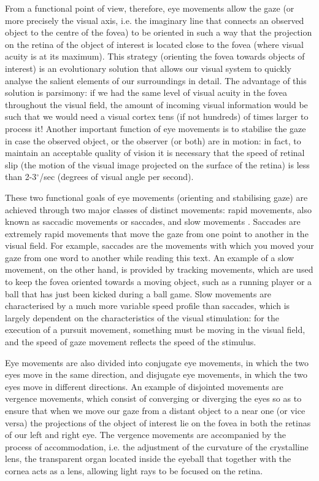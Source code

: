 \documentclass[11pt]{article}
\begin{document}
From a functional point of view, therefore, eye movements allow the gaze (or more precisely the visual axis, i.e. the imaginary line that connects an observed object to the centre of the fovea) to be oriented in such a way that the projection on the retina of the object of interest is located close to the fovea (where visual acuity is at its maximum). This strategy (orienting the fovea towards objects of interest) is an evolutionary solution that allows our visual system to quickly analyse the salient elements of our surroundings in detail. The advantage of this solution is parsimony: if we had the same level of visual acuity in the fovea throughout the visual field, the amount of incoming visual information would be such that we would need a visual cortex tens (if not hundreds) of times larger to process it! Another important function of eye movements is to stabilise the gaze in case the observed object, or the observer (or both) are in motion: in fact, to maintain an acceptable quality of vision it is necessary that the speed of retinal slip (the motion of the visual image projected on the surface of the retina) is less than 2-3$^{\circ}$/sec (degrees of visual angle per second).

These two functional goals of eye movements (orienting and stabilising gaze) are achieved through two major classes of distinct movements: rapid movements, also known as saccadic movements or saccades, and slow movements \cite{Steinman1990}. Saccades are extremely rapid movements that move the gaze from one point to another in the visual field. For example, saccades are the movements with which you moved your gaze from one word to another while reading this text. An example of a slow movement, on the other hand, is provided by tracking movements, which are used to keep the fovea oriented towards a moving object, such as a running player or a ball that has just been kicked during a ball game. Slow movements are characterised by a much more variable speed profile than saccades, which is largely dependent on the characteristics of the visual stimulation: for the execution of a pursuit movement, something must be moving in the visual field, and the speed of gaze movement reflects the speed of the stimulus.

Eye movements are also divided into conjugate eye movements, in which the two eyes move in the same direction, and disjugate eye movements, in which the two eyes move in different directions. An example of disjointed movements are vergence movements, which consist of converging or diverging the eyes so as to ensure that when we move our gaze from a distant object to a near one (or vice versa) the projections of the object of interest lie on the fovea in both the retinas of our left and right eye. The vergence movements are accompanied by the process of accommodation, i.e. the adjustment of the curvature of the crystalline lens, the transparent organ located inside the eyeball that together with the cornea acts as a lens, allowing light rays to be focused on the retina.
\end{document}
